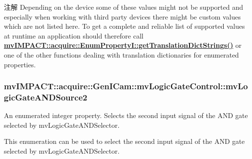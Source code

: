 \begin{DoxyNote}{注解}
Depending on the device some of these values might not be supported and especially when working with third party devices there might be custom values which are not listed here. To get a complete and reliable list of supported values at runtime an application should therefore call {\bfseries \hyperlink{classmv_i_m_p_a_c_t_1_1acquire_1_1_enum_property_i_a0ba6ccbf5ee69784d5d0b537924d26b6}{mv\+I\+M\+P\+A\+C\+T\+::acquire\+::\+Enum\+Property\+I\+::get\+Translation\+Dict\+Strings()}} or one of the other functions dealing with translation dictionaries for enumerated properties. 
\end{DoxyNote}
\hypertarget{classmv_i_m_p_a_c_t_1_1acquire_1_1_gen_i_cam_1_1mv_logic_gate_control_a99264f802944238bb3811996ad3bda19}{
\subsubsection[{mv\+Logic\+Gate\+A\+N\+D\+Source2}]{ mv\+I\+M\+P\+A\+C\+T\+::acquire\+::\+Gen\+I\+Cam\+::mv\+Logic\+Gate\+Control\+::mv\+Logic\+Gate\+A\+N\+D\+Source2}}\label{classmv_i_m_p_a_c_t_1_1acquire_1_1_gen_i_cam_1_1mv_logic_gate_control_a99264f802944238bb3811996ad3bda19}


An enumerated integer property. Selects the second input signal of the A\+N\+D gate selected by mv\+Logic\+Gate\+A\+N\+D\+Selector. 

This enumeration can be used to select the second input signal of the A\+N\+D gate selected by mv\+Logic\+Gate\+A\+N\+D\+Selector.

